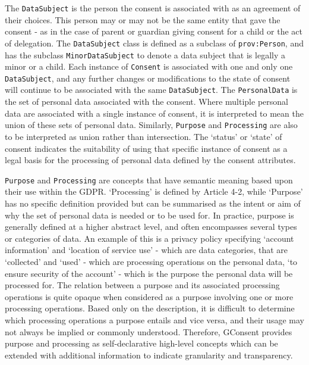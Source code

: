 The \texttt{DataSubject} is the person the consent is associated with as an agreement of their choices. This person may or may not be the same entity that gave the consent - as in the case of parent or guardian giving consent for a child or the act of delegation. The \texttt{DataSubject} class is defined as a subclass of \texttt{prov:Person}, and has the subclass \texttt{MinorDataSubject} to denote a data subject that is legally a minor or a child.
Each instance of \texttt{Consent} is associated with one and only one \texttt{DataSubject}, and any further changes or modifications to the state of consent will continue to be associated with the same \texttt{DataSubject}.
The \texttt{PersonalData} is the set of personal data associated with the consent. Where multiple personal data are associated with a single instance of consent, it is interpreted to mean the union of these sets of personal data. Similarly, \texttt{Purpose} and \texttt{Processing} are also to be interpreted as union rather than intersection.
The `status' or `state' of consent indicates the suitability of using that specific instance of consent as a legal basis for the processing of personal data defined by the consent attributes.

\texttt{Purpose} and \texttt{Processing} are concepts that have semantic meaning based upon their use within the GDPR.
`Processing' is defined by Article 4-2, while `Purpose' has no specific definition provided but can be summarised as the intent or aim of why the set of personal data is needed or to be used for. In practice, purpose is generally defined at a higher abstract level, and often encompasses several types or categories of data. An example of this is a privacy policy specifying `account information' and `location of service use' - which are data categories, that are `collected' and `used' - which are processing operations on the personal data, `to ensure security of the account' - which is the purpose the personal data will be processed for. The relation between a purpose and its associated processing operations is quite opaque when considered as a purpose involving one or more processing operations. Based only on the description, it is difficult to determine which processing operations a purpose entails and vice versa, and their usage may not always be implied or commonly understood. Therefore, GConsent provides purpose and processing as self-declarative high-level concepts which can be extended with additional information to indicate granularity and transparency.

